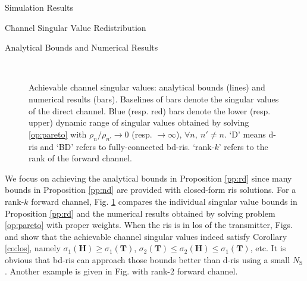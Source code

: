 \documentclass[journal]{IEEEtran}
\begin{document}
\begin{section}{Simulation Results}
\begin{subsection}{Channel Singular Value Redistribution}
		\begin{subsubsection}{Analytical Bounds and Numerical Results}
			\begin{figure}[!t]
				\centering
				\\
				\caption{
					Achievable channel singular values: analytical bounds (lines) and numerical results (bars).
					Baselines of bars denote the singular values of the direct channel.
					Blue (resp. red) bars denote the lower (resp. upper) dynamic range of singular values obtained by solving \eqref{op:pareto} with $\rho_n/\rho_{n'} \to 0$ (resp. $\to \infty$), $\forall n, \ n' \ne n$.
					`D' means \gls{d}-\gls{ris} and `BD' refers to fully-connected \gls{bd}-\gls{ris}.
					`rank-$k$' refers to the rank of the forward channel.
				}
				\label{fg:singular_bound}
			\end{figure}
			We focus on achieving the analytical bounds in Proposition \ref{pp:rd} since many bounds in Proposition \ref{pp:nd} are provided with closed-form \gls{ris} solutions.
			For a rank-$k$ forward channel, Fig. \ref{fg:singular_bound} compares the individual singular value bounds in Proposition \ref{pp:rd} and the numerical results obtained by solving problem \eqref{op:pareto} with proper weights.
			When the \gls{ris} is in \gls{los} of the transmitter, Figs.  and  show that the achievable channel singular values indeed satisfy Corollary \ref{co:los}, namely $\sigma_1(\mathbf{H}) \ge \sigma_1(\mathbf{T})$, $\sigma_2(\mathbf{T}) \le \sigma_2(\mathbf{H}) \le \sigma_1(\mathbf{T})$, etc.
			It is obvious that \gls{bd}-\gls{ris} can approach those bounds better than \gls{d}-\gls{ris} using a small $N_\mathrm{S}$.
			Another example is given in Fig.  with rank-2 forward channel.

\end{subsubsection}
\end{subsection}
\end{section}
\end{document}
